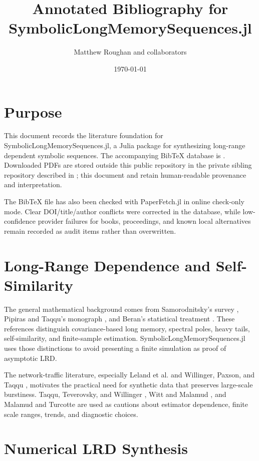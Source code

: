 \documentclass[11pt]{article}
\title{Annotated Bibliography for SymbolicLongMemorySequences.jl}
\author{Matthew Roughan and collaborators}
\date{\today}
\begin{document}
\maketitle

\section{Purpose}

This document records the literature foundation for SymbolicLongMemorySequences.jl, a Julia package for
synthesizing long-range dependent symbolic sequences. The accompanying BibTeX
database is . Downloaded PDFs are stored
outside this public repository in the private sibling repository described in
; this document and  retain
human-readable provenance and interpretation.

The BibTeX file has also been checked with PaperFetch.jl in online
check-only mode. Clear DOI/title/author conflicts were corrected in the
database, while low-confidence provider failures for books, proceedings, and
known local alternatives remain recorded as audit items rather than overwritten.

\section{Long-Range Dependence and Self-Similarity}

The general mathematical background comes from Samorodnitsky's survey
\cite{samorodnitsky2006_long}, Pipiras and Taqqu's monograph
\cite{pipiras2017_long}, and Beran's statistical treatment
\cite{beran1994_statistics}. These references distinguish covariance-based
long memory, spectral poles, heavy tails, self-similarity, and finite-sample
estimation. SymbolicLongMemorySequences.jl uses those distinctions to avoid presenting a finite
simulation as proof of asymptotic LRD.

The network-traffic literature, especially Leland et al.
\cite{leland1994_on} and Willinger, Paxson, and Taqqu
\cite{willinger1998_self}, motivates the practical need for synthetic data that
preserves large-scale burstiness. Taqqu, Teverovsky, and Willinger
\cite{taqqu1995_estimators}, Witt and Malamud \cite{witt2013_quantification},
and Malamud and Turcotte \cite{malamud1999_self} are used as cautions about
estimator dependence, finite scale ranges, trends, and diagnostic choices.

\section{Numerical LRD Synthesis}
\end{document}
